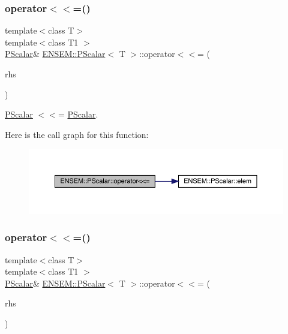 \subsubsection{\texorpdfstring{operator$<$$<$=()}{operator<<=()}\hspace{0.1cm}{\footnotesize\ttfamily [1/3]}}
{\footnotesize\ttfamily template$<$class T$>$ \\
template$<$class T1 $>$ \\
\mbox{\hyperlink{classENSEM_1_1PScalar}{P\+Scalar}}\& \mbox{\hyperlink{classENSEM_1_1PScalar}{E\+N\+S\+E\+M\+::\+P\+Scalar}}$<$ T $>$\+::operator$<$$<$= (\begin{DoxyParamCaption}\item[{const \mbox{\hyperlink{classENSEM_1_1PScalar}{P\+Scalar}}$<$ T1 $>$ \&}]{rhs }\end{DoxyParamCaption})\hspace{0.3cm}{\ttfamily [inline]}}



\mbox{\hyperlink{classENSEM_1_1PScalar}{P\+Scalar}} $<$$<$= \mbox{\hyperlink{classENSEM_1_1PScalar}{P\+Scalar}}. 

Here is the call graph for this function\+:
\nopagebreak
\begin{figure}[H]
\begin{center}
\leavevmode
\includegraphics[width=350pt]{d3/d27/classENSEM_1_1PScalar_ade643675ab6ef041676e1098ac740b29_cgraph}
\end{center}
\end{figure}
\mbox{\label{classENSEM_1_1PScalar_ade643675ab6ef041676e1098ac740b29}} 
\subsubsection{\texorpdfstring{operator$<$$<$=()}{operator<<=()}\hspace{0.1cm}{\footnotesize\ttfamily [2/3]}}
{\footnotesize\ttfamily template$<$class T$>$ \\
template$<$class T1 $>$ \\
\mbox{\hyperlink{classENSEM_1_1PScalar}{P\+Scalar}}\& \mbox{\hyperlink{classENSEM_1_1PScalar}{E\+N\+S\+E\+M\+::\+P\+Scalar}}$<$ T $>$\+::operator$<$$<$= (\begin{DoxyParamCaption}\item[{const \mbox{\hyperlink{classENSEM_1_1PScalar}{P\+Scalar}}$<$ T1 $>$ \&}]{rhs }\end{DoxyParamCaption})\hspace{0.3cm}{\ttfamily [inline]}}



